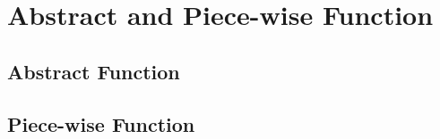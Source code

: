 \chapterspaceabove{6.75cm} 
\chapterspacebelow{7.25cm} 
\chapter{Abstract and Piece-wise Function}

    \section{Abstract Function}

    \section{Piece-wise Function}
